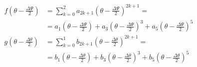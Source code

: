\documentclass[review]{elsarticle}
\begin{document}
\begin{description}
\begin{equation}
\begin{aligned}
f\left(\theta-\frac{\Delta\Psi}{2}\right)&=\sum_{k=0}^{2}a_{2k+1}\left(\theta-\frac{\Delta\Psi}{2}\right)^{2k+1}=\\&=a_{1}\left(\theta-\frac{\Delta\Psi}{2}\right)+a_{3}\left(\theta-\frac{\Delta\Psi}{2}\right)^{3}+a_{5}\left(\theta-\frac{\Delta\Psi}{2}\right)^{5}\\
g\left(\theta-\frac{\Delta\theta}{2}\right)&=\sum_{k=0}^{1}b_{2k+1}\left(\theta-\frac{\Delta\theta}{2}\right)^{2k+1}=\\&=b_{1}\left(\theta-\frac{\Delta\theta}{2}\right)+b_{3}\left(\theta-\frac{\Delta\theta}{2}\right)^{3}+b_{5}\left(\theta-\frac{\Delta\theta}{2}\right)^{5}\\
\end{aligned}
\end{equation}
\end{description}
\end{document}
